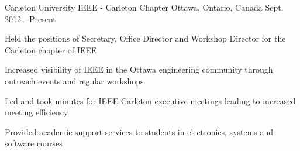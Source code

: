 

\begin{cventries}

  \cventry
    {Carleton University} %
    {IEEE - Carleton Chapter} %
    {Ottawa, Ontario, Canada} %
    {Sept. 2012 - Present} %
    {
      \begin{cvitems} %
        \item {Held the positions of Secretary, Office Director and Workshop Director for the Carleton chapter of IEEE}
        \item {Increased visibility of IEEE in the Ottawa engineering community through outreach events and regular workshops}
        \item {Led and took minutes for IEEE Carleton executive meetings leading to increased meeting efficiency}
        \item {Provided academic support services to students in electronics, systems and software courses}
      \end{cvitems}
    }

\end{cventries}
